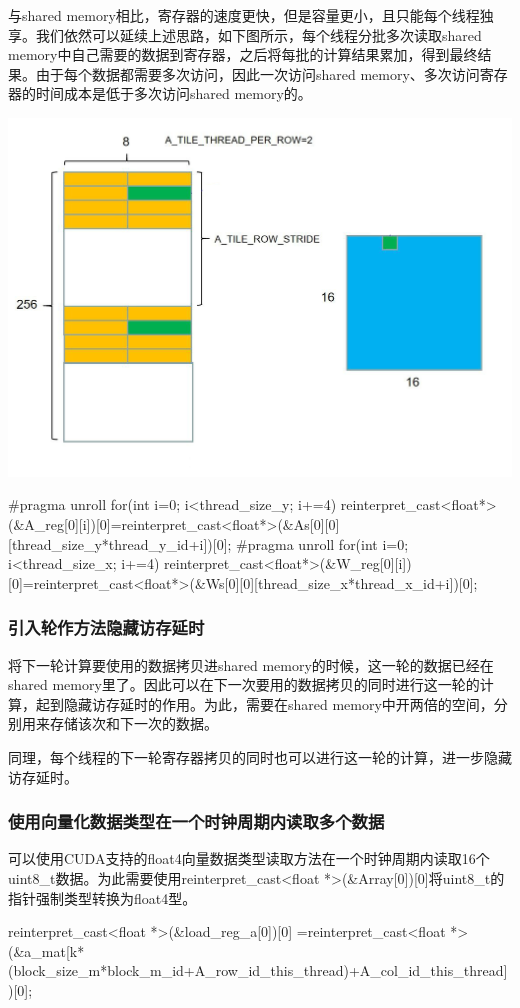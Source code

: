 \documentclass[UTF8,10pt]{ctexart}
\begin{document}
与shared memory相比，寄存器的速度更快，但是容量更小，且只能每个线程独享。我们依然可以延续上述思路，如下图所示，每个线程分批多次读取shared memory中自己需要的数据到寄存器，之后将每批的计算结果累加，得到最终结果。由于每个数据都需要多次访问，因此一次访问shared memory、多次访问寄存器的时间成本是低于多次访问shared memory的。
\begin{center}
\includegraphics[scale=0.3]{img/4.jpg}
\end{center}

\begin{python}
#pragma unroll
for(int i=0; i<thread_size_y; i+=4)
  reinterpret_cast<float*>(&A_reg[0][i])[0]=reinterpret_cast<float*>(&As[0][0][thread_size_y*thread_y_id+i])[0];
#pragma unroll
for(int i=0; i<thread_size_x; i+=4)
  reinterpret_cast<float*>(&W_reg[0][i])[0]=reinterpret_cast<float*>(&Ws[0][0][thread_size_x*thread_x_id+i])[0];
\end{python}

\subsubsection{引入轮作方法隐藏访存延时}
将下一轮计算要使用的数据拷贝进shared memory的时候，这一轮的数据已经在shared memory里了。因此可以在下一次要用的数据拷贝的同时进行这一轮的计算，起到隐藏访存延时的作用。为此，需要在shared memory中开两倍的空间，分别用来存储该次和下一次的数据。

同理，每个线程的下一轮寄存器拷贝的同时也可以进行这一轮的计算，进一步隐藏访存延时。

\subsubsection{使用向量化数据类型在一个时钟周期内读取多个数据}
可以使用CUDA支持的float4向量数据类型读取方法在一个时钟周期内读取16个uint8\_t数据。为此需要使用reinterpret\_cast<float *>(\&Array[0])[0]将uint8\_t的指针强制类型转换为float4型。
\begin{python}
reinterpret_cast<float *>(&load_reg_a[0])[0]
=reinterpret_cast<float *>(&a_mat[k*(block_size_m*block_m_id+A_row_id_this_thread)+A_col_id_this_thread])[0];
\end{python}
\end{document}
